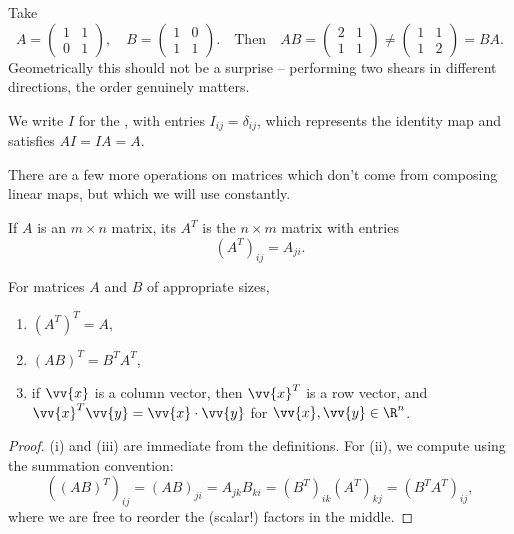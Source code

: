 \begin{example}
	Take
	$$
	A = \begin{pmatrix} 1 & 1 \\ 0 & 1\end{pmatrix}, \quad B = \begin{pmatrix} 1 & 0 \\ 1 & 1 \end{pmatrix}.
	\quad \text{Then} \quad
	AB = \begin{pmatrix} 2 & 1 \\ 1 & 1 \end{pmatrix} \neq \begin{pmatrix} 1 & 1 \\ 1 & 2\end{pmatrix} = BA.
	$$
	Geometrically this should not be a surprise -- performing two shears in different directions, the order genuinely matters.
\end{example}

We write $I$ for the , with entries $I_{ij} = \delta_{ij}$, which represents the identity map and satisfies $AI = IA = A$.

There are a few more operations on matrices which don't come from composing linear maps, but which we will use constantly.

\begin{definition}[Transpose]
	If $A$ is an $m \times n$ matrix, its  $A^T$ is the $n \times m$ matrix with entries
	$$
	(A^T)_{ij} = A_{ji}.
	$$
\end{definition}

\begin{proposition}
	For matrices $A$ and $B$ of appropriate sizes,
	\begin{enumerate}[label=(\roman*)]
		\item $(A^T)^T = A$,
		\item $(AB)^T = B^T A^T$,
		\item if $\vv{x}$ is a column vector, then $\vv{x}^T$ is a row vector, and $\vv{x}^T \vv{y} = \vv{x} \cdot \vv{y}$ for $\vv{x}, \vv{y} \in \R^n$.
	\end{enumerate}
\end{proposition}
\begin{proof}
	(i) and (iii) are immediate from the definitions. For (ii), we compute using the summation convention:
	$$
	((AB)^T)_{ij} = (AB)_{ji} = A_{jk}B_{ki} = (B^T)_{ik}(A^T)_{kj} = (B^T A^T)_{ij},
	$$
	where we are free to reorder the (scalar!) factors in the middle.
\end{proof}

